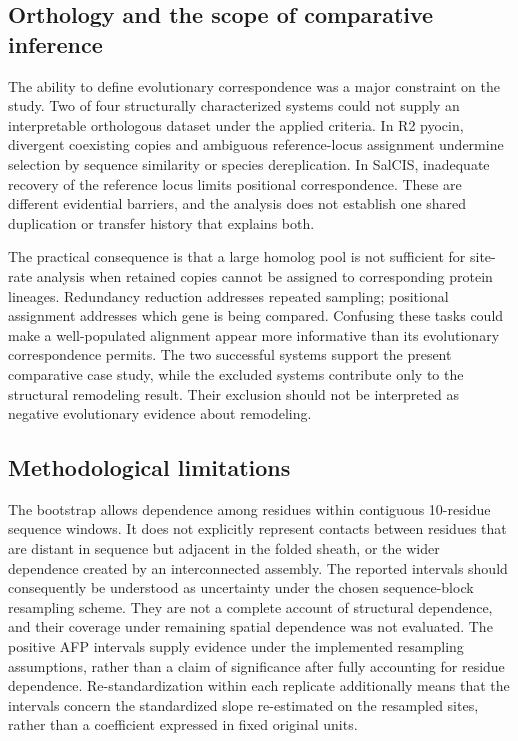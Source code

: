 \documentclass[11pt,a4paper]{article}
\begin{document}
\subsection{Orthology and the scope of comparative inference}

The ability to define evolutionary correspondence was a major constraint on the study. Two of four structurally characterized systems could not supply an interpretable orthologous dataset under the applied criteria. In R2 pyocin, divergent coexisting copies and ambiguous reference-locus assignment undermine selection by sequence similarity or species dereplication. In SalCIS, inadequate recovery of the reference locus limits positional correspondence. These are different evidential barriers, and the analysis does not establish one shared duplication or transfer history that explains both.

The practical consequence is that a large homolog pool is not sufficient for site-rate analysis when retained copies cannot be assigned to corresponding protein lineages. Redundancy reduction addresses repeated sampling; positional assignment addresses which gene is being compared. Confusing these tasks could make a well-populated alignment appear more informative than its evolutionary correspondence permits. The two successful systems support the present comparative case study, while the excluded systems contribute only to the structural remodeling result. Their exclusion should not be interpreted as negative evolutionary evidence about remodeling.

\subsection{Methodological limitations}

The bootstrap allows dependence among residues within contiguous 10-residue sequence windows. It does not explicitly represent contacts between residues that are distant in sequence but adjacent in the folded sheath, or the wider dependence created by an interconnected assembly. The reported intervals should consequently be understood as uncertainty under the chosen sequence-block resampling scheme. They are not a complete account of structural dependence, and their coverage under remaining spatial dependence was not evaluated. The positive AFP intervals supply evidence under the implemented resampling assumptions, rather than a claim of significance after fully accounting for residue dependence. Re-standardization within each replicate additionally means that the intervals concern the standardized slope re-estimated on the resampled sites, rather than a coefficient expressed in fixed original units.
\end{document}
